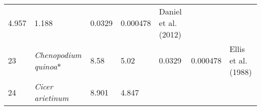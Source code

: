 \documentclass[]{article}
\begin{document}
\begin{longtable}[]{@{}lllllll@{}}
\begin{minipage}[t]{0.05\columnwidth}
4.957\strut
\end{minipage} & \begin{minipage}[t]{0.08\columnwidth}\raggedright
1.188\strut
\end{minipage} & \begin{minipage}[t]{0.08\columnwidth}\raggedright
0.0329\strut
\end{minipage} & \begin{minipage}[t]{0.08\columnwidth}\raggedright
0.000478\strut
\end{minipage} & \begin{minipage}[t]{0.23\columnwidth}\raggedright
Daniel et al. (2012)\strut
\end{minipage}\tabularnewline
\begin{minipage}[t]{0.05\columnwidth}\raggedright
23\strut
\end{minipage} & \begin{minipage}[t]{0.23\columnwidth}\raggedright
\emph{Chenopodium quinoa}*\strut
\end{minipage} & \begin{minipage}[t]{0.05\columnwidth}\raggedright
8.58\strut
\end{minipage} & \begin{minipage}[t]{0.08\columnwidth}\raggedright
5.02\strut
\end{minipage} & \begin{minipage}[t]{0.08\columnwidth}\raggedright
0.0329\strut
\end{minipage} & \begin{minipage}[t]{0.08\columnwidth}\raggedright
0.000478\strut
\end{minipage} & \begin{minipage}[t]{0.23\columnwidth}\raggedright
Ellis et al. (1988)\strut
\end{minipage}\tabularnewline
\begin{minipage}[t]{0.05\columnwidth}\raggedright
24\strut
\end{minipage} & \begin{minipage}[t]{0.23\columnwidth}\raggedright
\emph{Cicer arietinum}\strut
\end{minipage} & \begin{minipage}[t]{0.05\columnwidth}\raggedright
8.901\strut
\end{minipage} & \begin{minipage}[t]{0.08\columnwidth}\raggedright
4.847\strut
\end{minipage} & \begin{minipage}[t]{0.08\columnwidth}\raggedright

\end{minipage}
\end{longtable}
\end{document}
